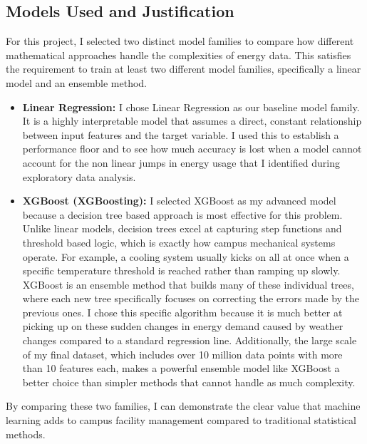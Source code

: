 \documentclass[conference]{IEEEtran}
\begin{document}
\subsection{Models Used and Justification}
For this project, I selected two distinct model families to compare how different mathematical approaches handle the complexities of energy data. This satisfies the requirement to train at least two different model families, specifically a linear model and an ensemble method.
\begin{itemize}
 \item \textbf{Linear Regression:} I chose Linear Regression as our baseline model family. It is a highly interpretable model that assumes a direct, constant relationship between input features and the target variable. I used this to establish a performance floor and to see how much accuracy is lost when a model cannot account for the non linear jumps in energy usage that I identified during exploratory data analysis. 
\item \textbf{XGBoost (XGBoosting):} I selected XGBoost as my advanced model because a decision tree based approach is most effective for this problem. Unlike linear models, decision trees excel at capturing step functions and threshold based logic, which is exactly how campus mechanical systems operate. For example, a cooling system usually kicks on all at once when a specific temperature threshold is reached rather than ramping up slowly. XGBoost is an ensemble method that builds many of these individual trees, where each new tree specifically focuses on correcting the errors made by the previous ones. I chose this specific algorithm because it is much better at picking up on these sudden changes in energy demand caused by weather changes compared to a standard regression line. Additionally, the large scale of my final dataset, which includes over 10 million data points with more than 10 features each, makes a powerful ensemble model like XGBoost a better choice than simpler methods that cannot handle as much complexity.
\end{itemize} 
By comparing these two families, I can demonstrate the clear value that machine learning adds to campus facility management compared to traditional statistical methods.
\end{document}
